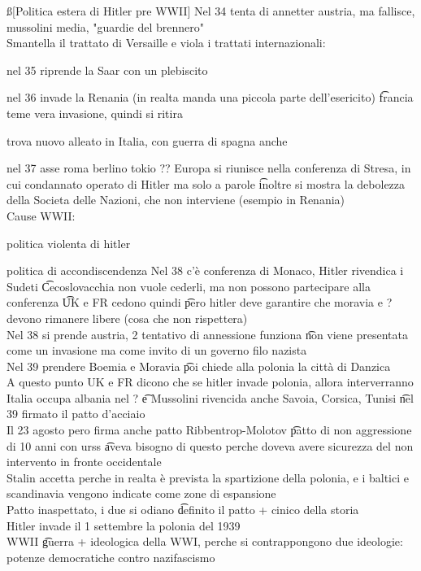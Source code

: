 \documentclass[12pt]{article}
\begin{document}
\ss[Politica estera di Hitler pre WWII]
Nel 34 tenta di annetter austria, ma fallisce, mussolini media, "guardie del brennero" \\
Smantella il trattato di Versaille e viola i trattati internazionali:
\bi
  \item nel 35 riprende la Saar con un plebiscito
  \item nel 36 invade la Renania (in realta manda una piccola parte dell'esericito) \t francia teme vera invasione, quindi si ritira
  \item trova nuovo alleato in Italia, con guerra di spagna anche
  \item nel 37 asse roma berlino tokio ??
\ei
Europa si riunisce nella conferenza di Stresa, in cui condannato operato di Hitler ma solo a parole \t inoltre si mostra la debolezza della Societa delle Nazioni, che non interviene (esempio in Renania) \\
Cause WWII: 
\bi
  \item politica violenta di hitler
  \item politica di accondiscendenza 
\ei
Nel 38 c'è conferenza di Monaco, Hitler rivendica i Sudeti \t Cecoslovacchia non vuole cederli, ma non possono partecipare alla conferenza \t UK e FR cedono quindi \t pero hitler deve garantire che moravia e ? devono rimanere libere (cosa che non rispettera) \\
Nel 38 si prende austria, 2 tentativo di annessione funziona \t non viene presentata come un invasione ma come invito di un governo filo nazista \\
Nel 39 prendere Boemia e Moravia \t poi chiede alla polonia la città di Danzica \\
A questo punto UK e FR dicono che se hitler invade polonia, allora interverranno \\
Italia occupa albania nel ? \t e Mussolini rivencida anche Savoia, Corsica, Tunisi \t nel 39 firmato il patto d'acciaio \\
Il 23 agosto pero firma anche patto Ribbentrop-Molotov \t patto di non aggressione di 10 anni con urss \t aveva bisogno di questo perche doveva avere sicurezza del non intervento in fronte occidentale \\
Stalin accetta perche in realta è prevista la spartizione della polonia, e i baltici e scandinavia vengono indicate come zone di espansione \\
Patto inaspettato, i due si odiano \t definito il patto + cinico della storia \\
Hitler invade il 1 settembre la polonia del 1939 \\
WWII \t guerra + ideologica della WWI, perche si contrappongono due ideologie: potenze democratiche contro nazifascismo
\end{document}
